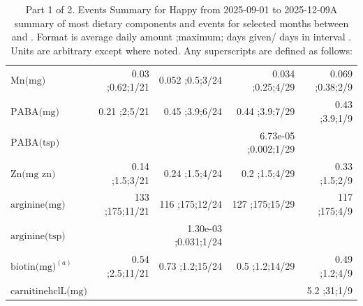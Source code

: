 \begin{table}[H]
\begin{tabular}{|l|r|r|r|r|}
$\textrm{Mn(mg)}$&0.03 ;0.62;1/21&0.052 ;0.5;3/24&0.034 ;0.25;4/29&0.069 ;0.38;2/9\\
$\textrm{PABA(mg)}$&0.21 ;2;5/21&0.45 ;3.9;6/24&0.44 ;3.9;7/29&0.43 ;3.9;1/9\\
$\textrm{PABA(tsp)}$&&&6.73e-05 ;0.002;1/29&\\
$\textrm{Zn(mg~zn)}$&0.14 ;1.5;3/21&0.24 ;1.5;4/24&0.2 ;1.5;4/29&0.33 ;1.5;2/9\\
$\textrm{arginine(mg)}$&133 ;175;11/21&116 ;175;12/24&127 ;175;15/29&117 ;175;4/9\\
$\textrm{arginine(tsp)}$&&1.30e-03 ;0.031;1/24&&\\
$\textrm{biotin(mg)}^{\left(a\right)}$&0.54 ;2.5;11/21&0.73 ;1.2;15/24&0.5 ;1.2;14/29&0.49 ;1.2;4/9\\
$\textrm{carnitinehclL(mg)}$&&&&5.2 ;31;1/9\\
\hline
\end{tabular}
\caption{Part 1 of 2.  Events Summary for Happy   from 2025-09-01 to 2025-12-09A summary of most dietary components and events  for selected months between \mjmdateminln and \mjmdatemaxln. Format is average daily amount ;maximum; days given/ days in interval . Units are arbitrary except where noted. Any  superscripts are defined as follows:  \mjmsuperscriptsln}
\end{table}
